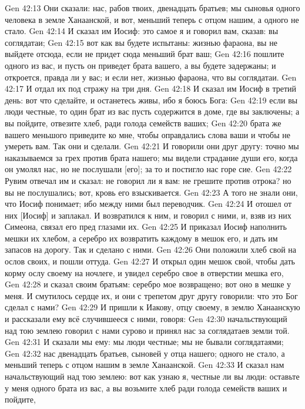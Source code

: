 \vs Gen 42:13 Они сказали: нас, рабов твоих, двенадцать братьев; мы сыновья одного человека в земле Ханаанской, и вот, меньший теперь с отцом нашим, а одного не стало.
\vs Gen 42:14 И сказал им Иосиф: это самое я и говорил вам, сказав: вы соглядатаи;
\vs Gen 42:15 вот как вы будете испытаны:  жизнью фараона, вы не выйдете отсюда, если не придет сюда меньший брат ваш;
\vs Gen 42:16 пошлите одного из вас, и пусть он приведет брата вашего, а вы будете задержаны; и откроется, правда ли у вас; и если нет,  жизнью фараона, что вы соглядатаи.
\vs Gen 42:17 И отдал их под стражу на три дня.
\vs Gen 42:18 И сказал им Иосиф в третий день: вот что сделайте, и останетесь живы, ибо я боюсь Бога:
\vs Gen 42:19 если вы люди честные, то один брат из вас пусть содержится в доме, где вы заключены; а вы пойдите, отвезите хлеб, ради голода семейств ваших;
\vs Gen 42:20 брата же вашего меньшого приведите ко мне, чтобы оправдались слова ваши и чтобы не умереть вам. Так они и сделали.
\vs Gen 42:21 И говорили они друг другу: точно мы наказываемся за грех против брата нашего; мы видели страдание души его, когда он умолял нас, но не послушали [его]; за то и постигло нас горе сие.
\vs Gen 42:22 Рувим отвечал им и сказал: не говорил ли я вам: не грешите против отрока? но вы не послушались; вот, кровь его взыскивается.
\vs Gen 42:23 А того не знали они, что Иосиф понимает; ибо между ними был переводчик.
\vs Gen 42:24 И отошел от них [Иосиф] и заплакал. И возвратился к ним, и говорил с ними, и, взяв из них Симеона, связал его пред глазами их.
\vs Gen 42:25 И приказал Иосиф наполнить мешки их хлебом, а серебро их возвратить каждому в мешок его, и дать им запасов на дорогу. Так и сделано с ними.
\vs Gen 42:26 Они положили хлеб свой на ослов своих, и пошли оттуда.
\vs Gen 42:27 И открыл один  мешок свой, чтобы дать корму ослу своему на ночлеге, и увидел серебро свое в отверстии мешка его,
\vs Gen 42:28 и сказал своим братьям: серебро мое возвращено; вот оно в мешке у меня. И смутилось сердце их, и они с трепетом друг другу говорили: что это Бог сделал с нами?
\vs Gen 42:29 И пришли к Иакову, отцу своему, в землю Ханаанскую и рассказали ему всё случившееся с ними, говоря:
\vs Gen 42:30 начальствующий над тою землею говорил с нами сурово и принял нас за соглядатаев земли той.
\vs Gen 42:31 И сказали мы ему: мы люди честные; мы не бывали соглядатаями;
\vs Gen 42:32 нас двенадцать братьев, сыновей у отца нашего; одного не стало, а меньший теперь с отцом нашим в земле Ханаанской.
\vs Gen 42:33 И сказал нам начальствующий над тою землею: вот как узнаю я, честные ли вы люди: оставьте у меня одного брата из вас, а вы возьмите хлеб ради голода семейств ваших и пойдите,
